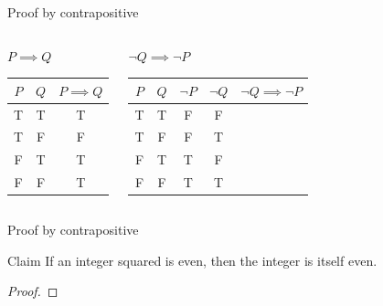 \documentclass [aspectratio=169]{beamer}
\newcommand{\Z}{{\mathbb{Z}}}
\begin{document}
\begin{frame}{Proof by contrapositive}
    \begin{columns}
        \begin{center}
        $P \implies Q$ \\
        \vspace{1.5em}
\begin{tabular}{|c|c| c|}
\hline
     $P$& $Q$ &  $P \implies Q$ \\ \hline
     T& T & T \\ \hline
     T & F & F \\ \hline
     F & T & T \\ \hline
     F & F & T \\ \hline
\end{tabular}
\end{center}
        \begin{center}
        $\neg Q \implies \neg P$ \\
        \vspace{1.5em}
        \begin{tabular}{|c | c | c |  c | c |}
\hline
     $P$& $Q$ & $\neg P$ &  $\neg Q$ & $\neg Q \implies \neg P$ \\ \hline
     T& T & F & F &  \\ \hline
     T & F & F &  T & \\ \hline
     F & T &  T  & F & \\ \hline
     F & F & T & T &  \\ \hline
\end{tabular}
\end{center}
\end{columns}
\end{frame}


\begin{frame}{Proof by contrapositive}
\begin{exampleblock}{Claim}
If an integer squared is even, then the integer is itself even.
\end{exampleblock}

\vspace{1em}

\begin{proof}

\vspace{6em}
\end{proof}

\end{frame}
\end{document}
